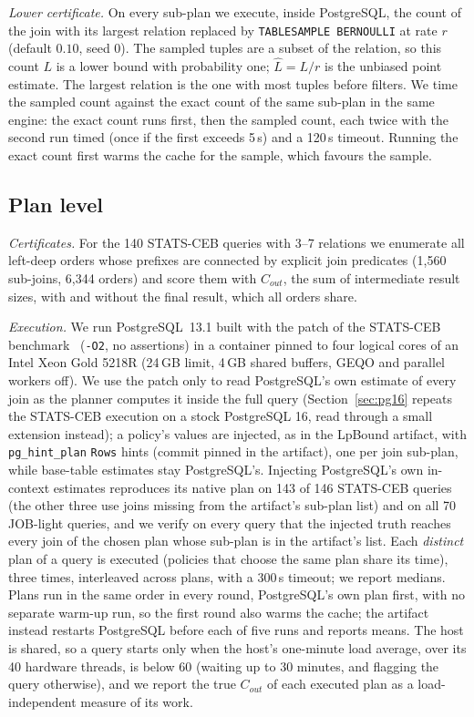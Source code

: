 \documentclass[sigconf, nonacm]{acmart}
\begin{document}
\emph{Lower certificate.} On every sub-plan we execute, inside PostgreSQL, the
count of the join with its largest relation replaced by
\texttt{TABLESAMPLE BERNOULLI} at rate $r$ (default $0.10$, seed 0). The sampled
tuples are a subset of the relation, so this count $L$ is a lower bound with
probability one; $\hat L = L/r$ is the unbiased point estimate. The largest
relation is the one with most tuples before filters. We time the sampled count
against the exact count of the same sub-plan in the same engine: the exact
count runs first, then the sampled count, each twice with the second run timed
(once if the first exceeds 5\,s) and a 120\,s timeout. Running the exact count
first warms the cache for the sample, which favours the sample.

\subsection{Plan level}
\emph{Certificates.} For the 140 STATS-CEB queries with 3--7 relations we
enumerate all left-deep orders whose prefixes are connected by explicit join
predicates (1{,}560 sub-joins, 6{,}344 orders) and score them with $C_{out}$,
the sum of intermediate result sizes, with and without the final result, which
all orders share.

\emph{Execution.} We run PostgreSQL~13.1 built with the patch of the
STATS-CEB benchmark~\cite{han2021cardest} (\texttt{-O2}, no assertions) in a
container pinned to four logical cores of an Intel Xeon Gold 5218R (24\,GB
limit, 4\,GB shared buffers, GEQO and parallel workers off). We use the patch
only to read PostgreSQL's own estimate of every join as the planner computes it
inside the full query (Section~\ref{sec:pg16} repeats the STATS-CEB execution on
a stock PostgreSQL 16, read through a small extension instead); a policy's
values are injected, as in the LpBound
artifact, with \texttt{pg\_hint\_plan} \texttt{Rows} hints (commit pinned in
the artifact), one per join sub-plan, while base-table estimates stay
PostgreSQL's. Injecting PostgreSQL's own in-context estimates reproduces its
native plan on 143 of 146 STATS-CEB queries (the other three use joins missing
from the artifact's sub-plan list) and on all 70 JOB-light queries, and we
verify on every query that the injected truth reaches every join of the chosen
plan whose sub-plan is in the artifact's list. Each \emph{distinct} plan of a query is executed (policies that choose
the same plan share its time), three times, interleaved across plans, with a
300\,s timeout; we report medians. Plans run in the same order in every round,
PostgreSQL's own plan first, with no separate warm-up run, so the first round
also warms the cache; the artifact instead restarts PostgreSQL before each of
five runs and reports means.
The host is shared, so a query starts only when the host's one-minute load
average, over its 40 hardware threads, is below 60 (waiting up to 30 minutes,
and flagging the query otherwise), and we
report the true $C_{out}$ of each executed plan as a load-independent measure
of its work.
\end{document}
